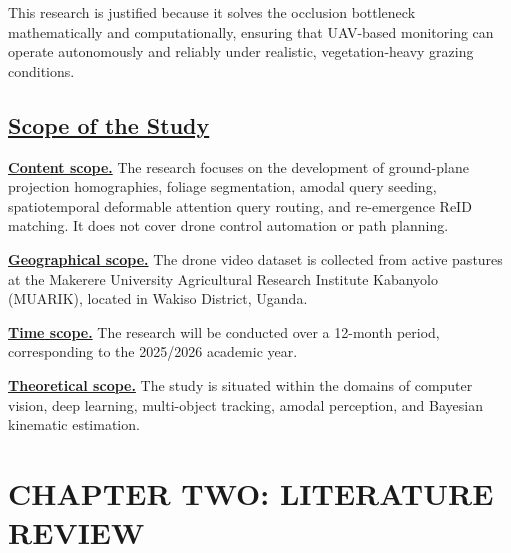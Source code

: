 \documentclass[12pt]{article}
\begin{document}
This research is justified because it solves the occlusion bottleneck mathematically and computationally, ensuring that UAV-based monitoring can operate autonomously and reliably under realistic, vegetation-heavy grazing conditions.

\subsection*{\underline{\textbf{Scope of the Study}}}

\hspace*{0.5in}\underline{\textbf{Content scope.}}
The research focuses on the development of ground-plane projection homographies, foliage segmentation, amodal query seeding, spatiotemporal deformable attention query routing, and re-emergence ReID matching. It does not cover drone control automation or path planning.

\hspace*{0.5in}\underline{\textbf{Geographical scope.}}
The drone video dataset is collected from active pastures at the Makerere University Agricultural Research Institute Kabanyolo (MUARIK), located in Wakiso District, Uganda.

\hspace*{0.5in}\underline{\textbf{Time scope.}}
The research will be conducted over a 12-month period, corresponding to the 2025/2026 academic year.

\hspace*{0.5in}\underline{\textbf{Theoretical scope.}}
The study is situated within the domains of computer vision, deep learning, multi-object tracking, amodal perception, and Bayesian kinematic estimation.

\clearpage

\section*{\centering \textbf{CHAPTER TWO: LITERATURE REVIEW}}
\end{document}
